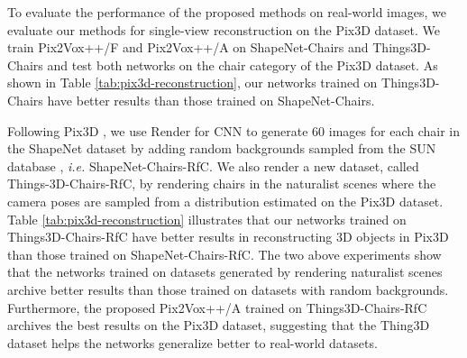 \documentclass[twocolumn]{svjour3}
\begin{document}
To evaluate the performance of the proposed methods on real-world images, we evaluate our methods for single-view reconstruction on the Pix3D dataset.
We train Pix2Vox++/F and Pix2Vox++/A on ShapeNet-Chairs and Things3D-Chairs and test both networks on the chair category of the Pix3D dataset.
As shown in Table \ref{tab:pix3d-reconstruction}, our networks trained on Things3D-Chairs have better results than those trained on ShapeNet-Chairs.

Following Pix3D \citep{DBLP:conf/cvpr/Sun0ZZZXTF18}, we use Render for CNN \citep{DBLP:conf/iccv/SuQLG15} to generate 60 images for each chair in the ShapeNet dataset by adding random backgrounds sampled from the SUN database \citep{DBLP:conf/cvpr/XiaoHEOT10}, {\it i.e.} ShapeNet-Chairs-RfC.
We also render a new dataset, called Things-3D-Chairs-RfC, by rendering chairs in the naturalist scenes where the camera poses are sampled from a distribution estimated on the Pix3D dataset.
Table \ref{tab:pix3d-reconstruction} illustrates that our networks trained on Things3D-Chairs-RfC have better results in reconstructing 3D objects in Pix3D than those trained on ShapeNet-Chairs-RfC.
The two above experiments show that the networks trained on datasets generated by rendering naturalist scenes archive better results than those trained on datasets with random backgrounds.
Furthermore, the proposed Pix2Vox++/A trained on Things3D-Chairs-RfC archives the best results on the Pix3D dataset, suggesting that the Thing3D dataset helps the networks generalize better to real-world datasets.
\end{document}
